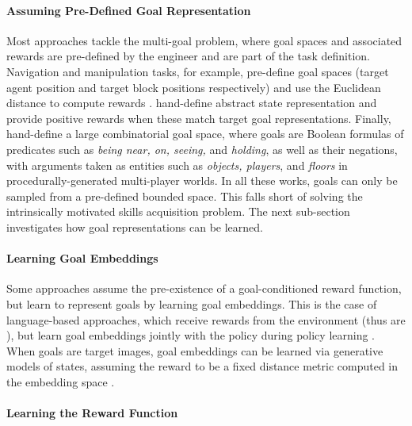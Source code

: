 \paragraph{Assuming Pre-Defined Goal Representation}
Most approaches tackle the multi-goal \rl problem, where goal spaces and associated rewards are pre-defined by the engineer and are part of the task definition. Navigation and manipulation tasks, for example, pre-define goal spaces (\eg target agent position and target block positions respectively) and use the Euclidean distance to compute rewards \cite{schaul2015universal,andrychowicz2017hindsight,nair2017overcoming,plappert2018multi,goalgan,curious,blaes2019control,lanier2019curiosity,ding_imitation_2019,li2019towards}. \cite{akakzia2020decstr,ecoffet2020first} hand-define abstract state representation and provide positive rewards when these match target goal representations. Finally, \cite{team2021open} hand-define a large combinatorial goal space, where goals are Boolean formulas of predicates such as \textit{being near, on, seeing,} and \textit{holding}, as well as their negations, with arguments taken as entities such as \textit{objects, players}, and \textit{floors} in procedurally-generated multi-player worlds.
In all these works, goals can only be sampled from a pre-defined bounded space. This falls short of solving the intrinsically motivated skills acquisition problem. The next sub-section investigates how goal representations can be learned.

\paragraph{Learning Goal Embeddings}
Some approaches assume the pre-existence of a goal-conditioned reward function, but learn to represent goals by learning goal embeddings. This is the case of language-based approaches, which receive rewards from the environment (thus are \rlemgep), but learn goal embeddings jointly with the policy during policy learning \cite{Hermann2017,chan2019actrce,Jiang2019,bahdanau2018systematic,hill2019emergent,ther,lynch2020grounding}. When goals are target images, goal embeddings can be learned via generative models of states, assuming the reward to be a fixed distance metric computed in the embedding space \cite{nair2018visual,florensa2019selfsupervised,pong2019skew,nair2020contextual}.

\paragraph{Learning the Reward Function}
\label{sec:survey_learning_goal_rep_rew}

